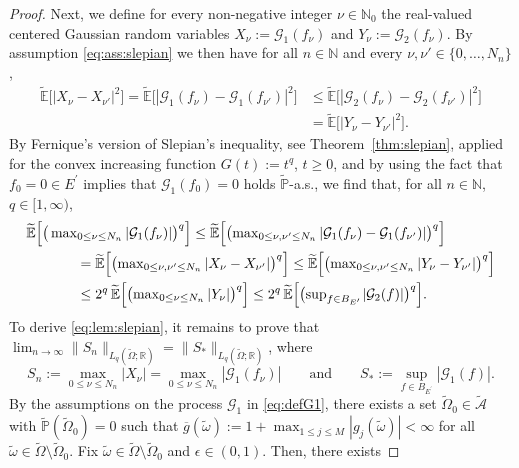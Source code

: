 \documentclass[reqno]{amsart}
\numberwithin{equation}{section}
\newcommand{\bbE}{\mathbb{E}}
\newcommand{\bbN}{\mathbb{N}}
\newcommand{\bbP}{\mathbb{P}}
\newcommand{\bbR}{\mathbb{R}}
\newcommand{\cA}{\mathcal{A}}
\newcommand{\cG}{\mathcal{G}}
\newcommand{\Omegat}{\widetilde{\Omega}}
\newcommand{\omegat}{\widetilde{\omega}}
\newcommand{\cAt}{\widetilde{\cA}}
\newcommand{\bbPt}{\widetilde{\bbP}}
\newcommand{\bbEt}{\widetilde{\bbE}}
\newcommand{\norm}[2]{     \| #1       \|_{ #2 }}
\newcommand{\dual}[1]{{#1}^{\prime}}
\theoremstyle{remark}
\theoremstyle{definition}
\begin{document}
\begin{proof}
	Next, 
	we define for every 
	non-negative integer $\nu\in\bbN_0$   
	the real-valued centered Gaussian random variables 
	$X_\nu := \cG_1( f_\nu )$ 
	and 
	$Y_\nu := \cG_2( f_\nu )$. 
	By assumption \eqref{eq:ass:slepian} we then have 
	for all $n\in\bbN$ and every $\nu,\nu'\in\{0,\ldots,N_n\}$, 
	\begin{align*} 
		\bbEt \bigl[ | X_\nu - X_{\nu'} |^2 \bigr] 
		=
		\bbEt \bigl[ | \cG_1(f_\nu) - \cG_1(f_{\nu'}) |^2 \bigr] 
		&\leq 
		\bbEt \bigl[ | \cG_2(f_\nu) - \cG_2(f_{\nu'}) |^2 \bigr] 
		\\
		&= 
		\bbEt \bigl[ | Y_\nu - Y_{\nu'} |^2 \bigr] . 
	\end{align*} 
	By Fernique's version of Slepian's inequality, 
	see Theorem~\ref{thm:slepian}, 
	applied for the convex increasing function 
	$G(t) := t^q$, $t\geq 0$, 
	and by using the fact that $f_0 = 0\in \dual{E}$ 
	implies that $\cG_1(f_0) = 0$ 
	holds $\bbPt$-a.s., 
	we find that, for all $n\in\bbN$, $q\in[1,\infty)$, 
	\begin{align*} 
		\bbEt \Bigl[ \bigl( &\max\nolimits_{0\leq\nu\leq N_n} | \cG_1(f_\nu) | \bigr)^q \Bigr] 
		\leq
		\bbEt \Bigl[ \bigl( \max\nolimits_{0\leq\nu,\nu'\leq N_n} | \cG_1(f_\nu) 
		- \cG_1(f_{\nu'}) | \bigr)^q \Bigr] 
		\\
		&\qquad =  
		\bbEt \Bigl[ \bigl( \max\nolimits_{0\leq\nu,\nu'\leq N_n} |X_\nu - X_{\nu'} | \bigr)^q \Bigr] 
		\leq 
		\bbEt \Bigl[ \bigl( \max\nolimits_{0\leq\nu,\nu'\leq N_n} |Y_\nu - Y_{\nu'} | \bigr)^q \Bigr] 
		\\
		&\qquad \leq  
		2^q \, \bbEt \Bigl[ \bigl( \max\nolimits_{0\leq\nu\leq N_n} |Y_\nu | \bigr)^q \Bigr] 
		\leq   
		2^q \, \bbEt \Bigl[ \bigl( \sup\nolimits_{f\in B_{\dual{E}\!}} | \cG_2(f) | \bigr)^q \Bigr]. 
	\end{align*} 
	To derive \eqref{eq:lem:slepian}, 
	it remains to prove that 
	$\lim_{n\to\infty}\norm{S_n}{L_q(\Omegat;\bbR)} = \norm{S_*}{L_q(\Omegat;\bbR)}$, 
	where 
	\[
		S_n 
		:= 
		\max\limits_{0\leq \nu\leq N_n} | X_\nu | 
		= 
		\max\limits_{0\leq \nu\leq N_n} | \cG_1(f_\nu) | 
		\qquad\text{and}\qquad 
		S_* := \sup\limits_{f\in B_{\dual{E}\!}} | \cG_1(f) | . 
	\]
	By the assumptions on the process $\cG_1$ in \eqref{eq:defG1},  
	there exists a set 
	$\Omegat_0\in\cAt$ with 
	$\bbPt(\Omegat_0)=0$ 
	such that 
	$\overline{g}(\omegat) := 1 + \max_{1\leq j \leq M} |g_j(\omegat)| < \infty$ 
	for all 
	$\omegat\in\Omegat\setminus\Omegat_0$. 
	Fix $\omegat\in\Omegat\setminus\Omegat_0$ 
	and $\epsilon\in(0,1)$. 
	Then, there exists 

\end{proof}
\end{document}
